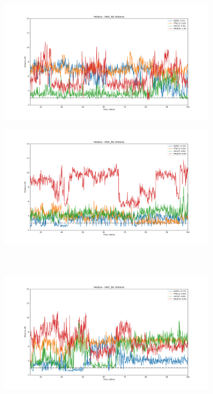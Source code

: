 \documentclass[fleqn,10pt]{wlscirep}
\begin{document}
\begin{figure}[!ht]
\centering
   \begin{subfigure}{.45\textwidth}
     \centering
     \includegraphics[width=.95\linewidth]{2AZC_flip/2AZC_flip-dist_0.png}
   \end{subfigure}
   \begin{subfigure}{.45\textwidth}
     \centering
     \includegraphics[width=.95\linewidth]{2AZC_flip/2AZC_flip-dist_1.png}
   \end{subfigure}
   \\
   \begin{subfigure}{.45\textwidth}
     \centering
     \includegraphics[width=.95\linewidth]{2AZC_flip/2AZC_flip-dist_2.png}

\end{subfigure}
\end{figure}
\end{document}
